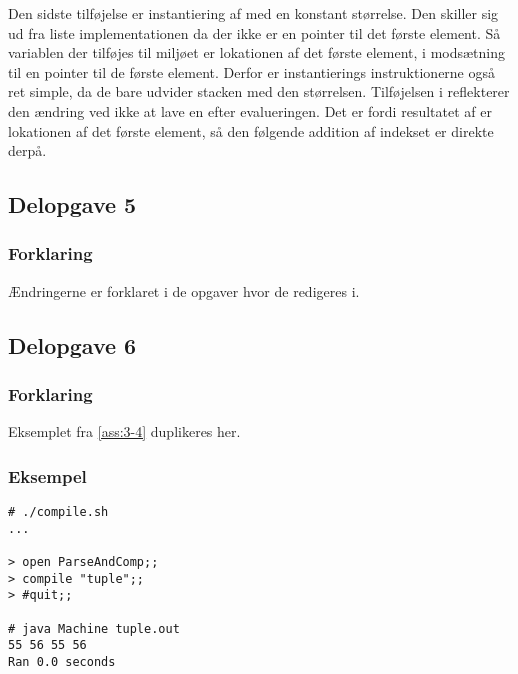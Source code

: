 Den sidste tilføjelse er instantiering af  med en konstant størrelse. Den skiller sig ud fra liste implementationen da der ikke er en pointer til det første element. Så variablen der tilføjes til miljøet er lokationen af det første element, i modsætning til en pointer til de første element. Derfor er instantierings instruktionerne også ret simple, da de bare udvider stacken med den størrelsen. Tilføjelsen i  reflekterer den ændring ved ikke at lave en  efter  evalueringen. Det er fordi resultatet af  er lokationen af det første element, så den følgende addition af indekset er direkte derpå.

\subsection{Delopgave 5}\label{ass:3-5}
\subsubsection{Forklaring}
Ændringerne er forklaret i de opgaver hvor de redigeres i.

\subsection{Delopgave 6}\label{ass:3-6}
\subsubsection{Forklaring}
Eksemplet fra \ref{ass:3-4} duplikeres her.

\subsubsection{Eksempel}
\begin{lstlisting}
# ./compile.sh
...

> open ParseAndComp;;
> compile "tuple";;
> #quit;;

# java Machine tuple.out
55 56 55 56
Ran 0.0 seconds
\end{lstlisting}

